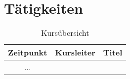 \chapter{Tätigkeiten}

\begin{table}
\caption{ Kursübersicht}
\begin{tabular}{|c|c|c|}
\hline
Zeitpunkt & Kursleiter & Titel \\
\hline 
 ...   
\end{tabular}
\end{table}